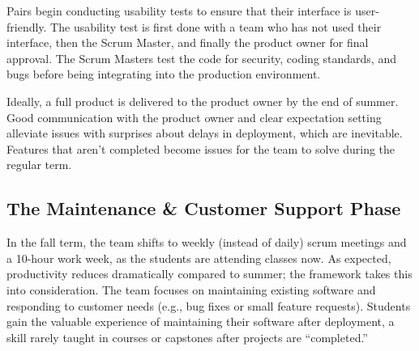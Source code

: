 
Pairs begin conducting usability tests \cite{usabilitytesting} to ensure that their interface is user-friendly. The usability test is first done with a team who has not used their interface, then the Scrum Master, and finally the product owner for final approval. The Scrum Masters test the code for security, coding standards, and bugs before being integrating into the production environment. 


Ideally, a full product is delivered to the product owner by the end of summer. Good communication with the product owner and clear expectation setting alleviate issues with surprises about delays in deployment, which are inevitable. Features that aren't completed become issues for the team to solve during the regular term. 

\subsection{The Maintenance \& Customer Support Phase}
In the fall term, the team shifts to weekly (instead of daily) scrum meetings and a 10-hour work week, as the students are attending classes now. As expected, productivity reduces dramatically compared to summer; the framework takes this into consideration. The team focuses on maintaining existing software and responding to customer needs (e.g., bug fixes or small feature requests). Students gain the valuable experience of maintaining their software after deployment, a skill rarely taught in courses or capstones after projects are ``completed.''

